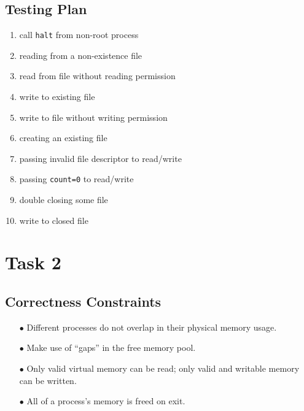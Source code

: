 \documentclass{article}
\begin{document}
\begin{spacing}{1.1}
\subsection{Testing Plan}
\begin{enumerate}
\item call \texttt{halt} from non-root process
\item reading from a non-existence file
\item read from file without reading permission
\item write to existing file
\item write to file without writing permission
\item creating an existing file
\item passing invalid file descriptor to read/write
\item passing \texttt{count=0} to read/write
\item double closing some file
\item write to closed file
\end{enumerate}

\section{Task 2}

\subsection{Correctness Constraints}
\begin{enumerate}
  \item[$\bullet$] Different processes do not overlap in their physical memory usage.
  \item[$\bullet$] Make use of ``gaps'' in the free memory pool.
  \item[$\bullet$] Only valid virtual memory can be read; only valid and writable
    memory can be written.
  \item[$\bullet$] All of a process's memory is freed on exit.
\end{enumerate}


\end{spacing}
\end{document}
